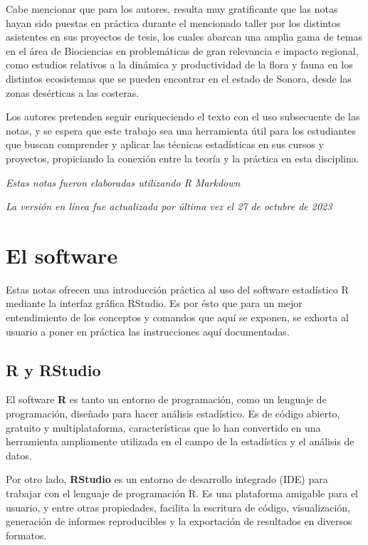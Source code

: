 \documentclass[
]{book}
\begin{document}
Cabe mencionar que para los autores, resulta muy gratificante que las notas hayan sido puestas en práctica durante el mencionado taller por los distintos asistentes en sus proyectos de tesis, los cuales abarcan una amplia gama de temas en el área de Biociencias en problemáticas de gran relevancia e impacto regional, como estudios relativos a la dinámica y productividad de la flora y fauna en los distintos ecosistemas que se pueden encontrar en el estado de Sonora, desde las zonas desérticas a las costeras.

Los autores pretenden seguir enriqueciendo el texto con el uso subsecuente de las notas, y se espera que este trabajo sea una herramienta útil para los estudiantes que buscan comprender y aplicar las técnicas estadísticas en sus cursos y proyectos, propiciando la conexión entre la teoría y la práctica en esta disciplina.

\emph{Estas notas fueron elaboradas utilizando R Markdown}

\emph{La versión en línea fue actualizada por última vez el 27 de octubre de 2023}

\hypertarget{el-software}{%
\chapter{El software}\label{el-software}}

Estas notas ofrecen una introducción práctica al uso del software estadístico R mediante la interfaz gráfica RStudio. Es por ésto que para un mejor entendimiento de los conceptos y comandos que aquí se exponen, se exhorta al usuario a poner en práctica las instrucciones aquí documentadas.

\hypertarget{r-y-rstudio}{%
\section{R y RStudio}\label{r-y-rstudio}}

El software \textbf{R} es tanto un entorno de programación, como un lenguaje de programación, diseñado para hacer análisis estadístico. Es de código abierto, gratuito y multiplataforma, características que lo han convertido en una herramienta ampliamente utilizada en el campo de la estadística y el análisis de datos.

Por otro lado, \textbf{RStudio} es un entorno de desarrollo integrado (IDE) para trabajar con el lenguaje de programación R. Es una plataforma amigable para el usuario, y entre otras propiedades, facilita la escritura de código, visualización, generación de informes reproducibles y la exportación de resultados en diversos formatos.
\end{document}
